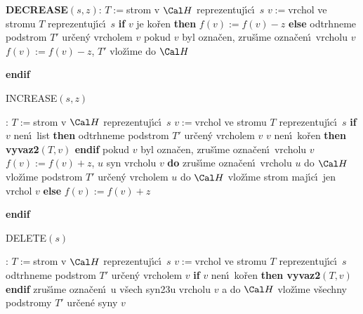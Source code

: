 {\bf DECREASE$(s,z)$}:\newline 
$T:=$strom v $\Cal H$ reprezentuj\'\i c\'\i\ $s$\newline 
$v:=$vrchol ve stromu $T$ reprezentuj\'\i c\'\i\ $s$\newline 
{\bf if} $v$ je ko\v ren {\bf then}\newline 
\phantom{---}$f(v):=f(v)-z$\newline 
{\bf else\newline}
\phantom{---}odtrhneme podstrom $T'$ ur\v cen\'y vrcholem $v$\newline 
\phantom{---}{\bf vyvaz2$(T,v)$\newline}
\phantom{---}pokud $v$ byl ozna\v cen, zru\v s\'\i me ozna\v cen\'\i\ vrcholu $
v$\newline 
\phantom{---}$f(v):=f(v)-z$, $T'$ vlo\v z\'\i me do $\Cal H$\newline 
{\bf endif
\bigskip

INCREASE$(s,z)$}:\newline 
$T:=$strom v $\Cal H$ reprezentuj\'\i c\'\i\ $s$\newline 
$v:=$vrchol ve stromu $T$ reprezentuj\'\i c\'\i\ $s$\newline 
{\bf if} $v$ nen\'\i\ list {\bf then\newline}
\phantom{---}odtrhneme podstrom $T'$ ur\v cen\'y vrcholem $v$\newline 
\phantom{---}{\bf if} $v$ nen\'\i\ ko\v ren {\bf then vyvaz2$(T,v)$ endif\newline}
\phantom{---}pokud $v$ byl ozna\v cen, zru\v s\'\i me ozna\v cen\'\i\ vrcholu $
v$\newline 
\phantom{---}$f(v):=f(v)+z$,\newline 
\phantom{---}{\bf for every} $u$ syn vrcholu $v$ {\bf do\newline}
\phantom{------}zru\v s\'\i me ozna\v cen\'\i\ vrcholu $u$ \newline 
\phantom{------}do $\Cal H$ vlo\v z\'\i me podstrom $T'$ ur\v cen\'y vrcholem $u$\newline 
\phantom{---}{\bf enddo\newline}
\phantom{---}do $\Cal H$ vlo\v z\'\i me strom maj\'\i c\'\i\ jen vrchol $v$\newline
{\bf else}\newline 
\phantom{---}$f(v):=f(v)+z$\newline 
{\bf endif
\bigskip

DELETE$(s)$}:\newline 
$T:=$strom v $\Cal H$ reprezentuj\'\i c\'\i\ $s$\newline 
$v:=$vrchol ve stromu $T$ reprezentuj\'\i c\'\i\ $s$\newline 
odtrhneme podstrom $T'$ ur\v cen\'y vrcholem $v$\newline 
{\bf if} $v$ nen\'\i\ ko\v ren {\bf then vyvaz2$(T,v)$ endif}\newline 
zru\v s\'\i me ozna\v cen\'\i\ u v\v sech syn\accent23u vrcholu $
v$ a\newline 
do $\Cal H$ vlo\v z\'\i me v\v sechny podstromy $T'$ ur\v cen\'e syny $
v$
\bigskip

